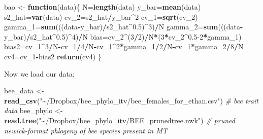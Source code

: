 \documentclass[
]{article}
\newenvironment{Shaded}{\begin{snugshade}}{\end{snugshade}}
\newcommand{\CommentTok}[1]{\textcolor[rgb]{0.56,0.35,0.01}{\textit{#1}}}
\newcommand{\ControlFlowTok}[1]{\textcolor[rgb]{0.13,0.29,0.53}{\textbf{#1}}}
\newcommand{\DecValTok}[1]{\textcolor[rgb]{0.00,0.00,0.81}{#1}}
\newcommand{\FloatTok}[1]{\textcolor[rgb]{0.00,0.00,0.81}{#1}}
\newcommand{\FunctionTok}[1]{\textcolor[rgb]{0.13,0.29,0.53}{\textbf{#1}}}
\newcommand{\NormalTok}[1]{#1}
\newcommand{\OtherTok}[1]{\textcolor[rgb]{0.56,0.35,0.01}{#1}}
\newcommand{\SpecialCharTok}[1]{\textcolor[rgb]{0.81,0.36,0.00}{\textbf{#1}}}
\newcommand{\StringTok}[1]{\textcolor[rgb]{0.31,0.60,0.02}{#1}}
\begin{document}
\begin{Shaded}
\begin{Highlighting}[]
\NormalTok{bao }\OtherTok{\textless{}{-}} \ControlFlowTok{function}\NormalTok{(data)\{}
\NormalTok{  N}\OtherTok{=}\FunctionTok{length}\NormalTok{(data)}
\NormalTok{  y\_bar}\OtherTok{=}\FunctionTok{mean}\NormalTok{(data)}
\NormalTok{  s2\_hat}\OtherTok{=}\FunctionTok{var}\NormalTok{(data)}
\NormalTok{  cv\_2}\OtherTok{=}\NormalTok{s2\_hat}\SpecialCharTok{/}\NormalTok{y\_bar}\SpecialCharTok{\^{}}\DecValTok{2}
\NormalTok{  cv\_1}\OtherTok{=}\FunctionTok{sqrt}\NormalTok{(cv\_2)}
\NormalTok{  gamma\_1}\OtherTok{=}\FunctionTok{sum}\NormalTok{(((data}\SpecialCharTok{{-}}\NormalTok{y\_bar)}\SpecialCharTok{/}\NormalTok{s2\_hat}\SpecialCharTok{\^{}}\FloatTok{0.5}\NormalTok{)}\SpecialCharTok{\^{}}\DecValTok{3}\NormalTok{)}\SpecialCharTok{/}\NormalTok{N}
\NormalTok{  gamma\_2}\OtherTok{=}\FunctionTok{sum}\NormalTok{(((data}\SpecialCharTok{{-}}\NormalTok{y\_bar)}\SpecialCharTok{/}\NormalTok{s2\_hat}\SpecialCharTok{\^{}}\FloatTok{0.5}\NormalTok{)}\SpecialCharTok{\^{}}\DecValTok{4}\NormalTok{)}\SpecialCharTok{/}\NormalTok{N}
\NormalTok{  bias}\OtherTok{=}\NormalTok{cv\_2}\SpecialCharTok{\^{}}\NormalTok{(}\DecValTok{3}\SpecialCharTok{/}\DecValTok{2}\NormalTok{)}\SpecialCharTok{/}\NormalTok{N}\SpecialCharTok{*}\NormalTok{(}\DecValTok{3}\SpecialCharTok{*}\NormalTok{cv\_2}\SpecialCharTok{\^{}}\FloatTok{0.5}\DecValTok{{-}2}\SpecialCharTok{*}\NormalTok{gamma\_1)}
\NormalTok{  bias2}\OtherTok{=}\NormalTok{cv\_1}\SpecialCharTok{\^{}}\DecValTok{3}\SpecialCharTok{/}\NormalTok{N}\SpecialCharTok{{-}}\NormalTok{cv\_1}\SpecialCharTok{/}\DecValTok{4}\SpecialCharTok{/}\NormalTok{N}\SpecialCharTok{{-}}\NormalTok{cv\_1}\SpecialCharTok{\^{}}\DecValTok{2}\SpecialCharTok{*}\NormalTok{gamma\_1}\SpecialCharTok{/}\DecValTok{2}\SpecialCharTok{/}\NormalTok{N}\SpecialCharTok{{-}}\NormalTok{cv\_1}\SpecialCharTok{*}\NormalTok{gamma\_2}\SpecialCharTok{/}\DecValTok{8}\SpecialCharTok{/}\NormalTok{N}
\NormalTok{  cv4}\OtherTok{=}\NormalTok{cv\_1}\SpecialCharTok{{-}}\NormalTok{bias2}
  \FunctionTok{return}\NormalTok{(cv4)}
\NormalTok{\}}
\end{Highlighting}
\end{Shaded}

Now we load our data:

\begin{Shaded}
\begin{Highlighting}[]
\NormalTok{bee\_data }\OtherTok{\textless{}{-}} \FunctionTok{read\_csv}\NormalTok{(}\StringTok{"\textasciitilde{}/Dropbox/bee\_phylo\_itv/bee\_females\_for\_ethan.csv"}\NormalTok{) }\CommentTok{\# bee trait data}
\NormalTok{bee\_phylo }\OtherTok{\textless{}{-}} \FunctionTok{read.tree}\NormalTok{(}\StringTok{"\textasciitilde{}/Dropbox/bee\_phylo\_itv/BEE\_prunedtree.nwk"}\NormalTok{) }\CommentTok{\# pruned newick{-}format phlogeny of bee species present in MT}
\end{Highlighting}
\end{Shaded}
\end{document}
